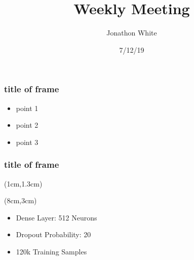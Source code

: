 \documentclass{beamer}
\title{Weekly Meeting}
\author{Jonathon White}
\date{7/12/19}
\begin{document}
\maketitle

\begin{frame}
\frametitle{title of frame}
\begin{itemize}
	\item{point 1}
	\item{point 2}
	\item{point 3}
\end{itemize}
\end{frame}

\begin{frame}
\frametitle{title of frame}
\begin{textblock*}{5cm}(1cm,1.3cm)
\end{textblock*}
\begin{textblock*}{5cm}(8cm,3cm)

\begin{itemize}
	\item{Dense Layer: 512 Neurons}
	\item{Dropout Probability: 20}
	\item{120k Training Samples}
\end{itemize}

\end{textblock*}
\end{frame}
\end{document}
